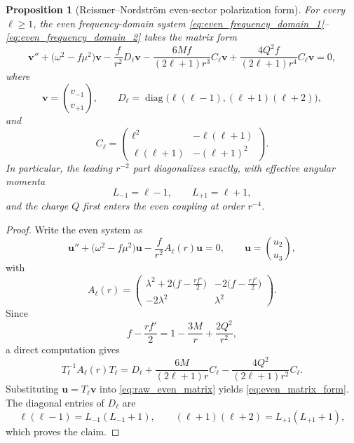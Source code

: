 \documentclass[12pt]{article}
\numberwithin{equation}{section}
\theoremstyle{plain}
\newtheorem{proposition}[theorem]{Proposition}
\theoremstyle{definition}
\theoremstyle{remark}
\newcommand{\diag}{\operatorname{diag}}
\newcommand{\la}{\lambda}
\newcommand{\om}{\omega}
\begin{document}
\begin{proposition}[Reissner--Nordstr\"om even-sector polarization form]\label{prop:even_polarization_form}
For every $\ell\ge1$, the even frequency-domain system
\eqref{eq:even_frequency_domain_1}--\eqref{eq:even_frequency_domain_2} takes the matrix form
\begin{equation}\label{eq:even_matrix_form}
   \bm v''+\bigl(\om^2-f\mu^2\bigr)\bm v
   -\frac{f}{r^2}D_\ell\bm v
   -\frac{6Mf}{(2\ell+1)r^3}C_\ell\bm v
   +\frac{4Q^2f}{(2\ell+1)r^4}C_\ell\bm v
   =0,
\end{equation}
where
\begin{equation}\label{eq:D_matrix}
   \bm v=\binom{v_{-1}}{v_{+1}},
   \qquad
   D_\ell=\diag\bigl(\ell(\ell-1),(\ell+1)(\ell+2)\bigr),
\end{equation}
and
\begin{equation}\label{eq:C_matrix}
   C_\ell=
   \begin{pmatrix}
      \ell^2&-\ell(\ell+1)\\
      \ell(\ell+1)&-(\ell+1)^2
   \end{pmatrix}.
\end{equation}
In particular, the leading $r^{-2}$ part diagonalizes exactly, with effective angular momenta
\begin{equation}\label{eq:effective_Ls}
   L_{-1}=\ell-1,
   \qquad
   L_{+1}=\ell+1,
\end{equation}
and the charge $Q$ first enters the even coupling at order $r^{-4}$.
\end{proposition}

\begin{proof}
Write the even system as
\begin{equation}\label{eq:raw_even_matrix}
   \bm u''+\bigl(\om^2-f\mu^2\bigr)\bm u
   -\frac{f}{r^2}A_\ell(r)\bm u
   =0,
   \qquad
   \bm u=\binom{u_2}{u_3},
\end{equation}
with
\begin{equation}\label{eq:raw_A_matrix}
   A_\ell(r)=
   \begin{pmatrix}
      \la^2+2\bigl(f-\tfrac{r f'}{2}\bigr) & -2\bigl(f-\tfrac{r f'}{2}\bigr)\\
      -2\la^2 & \la^2
   \end{pmatrix}.
\end{equation}
Since
\[
   f-\frac{r f'}{2}=1-\frac{3M}{r}+\frac{2Q^2}{r^2},
\]
a direct computation gives
\begin{equation}\label{eq:conjugated_A_matrix}
   T_\ell^{-1}A_\ell(r)T_\ell
   =
   D_\ell
   +\frac{6M}{(2\ell+1)r}C_\ell
   -\frac{4Q^2}{(2\ell+1)r^2}C_\ell.
\end{equation}
Substituting $\bm u=T_\ell\bm v$ into \eqref{eq:raw_even_matrix} yields
\eqref{eq:even_matrix_form}.  The diagonal entries of $D_\ell$ are
\[
   \ell(\ell-1)=L_{-1}(L_{-1}+1),
   \qquad
   (\ell+1)(\ell+2)=L_{+1}(L_{+1}+1),
\]
which proves the claim.
\end{proof}
\end{document}
